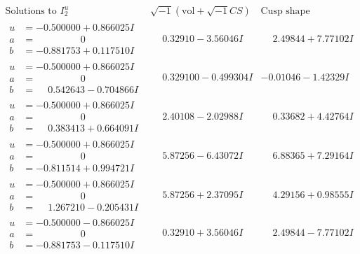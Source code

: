 \documentclass[1p]{elsarticle_modified}
\theoremstyle{definition}
\newcommand{\I}{\sqrt{-1}}
\begin{document}
$$\begin{array}{c|c|c}  
\text{Solutions to }I^u_{2}& \I (\text{vol} + \sqrt{-1}CS) & \text{Cusp shape}\\
 \hline 
\begin{aligned}
u &= -0.500000 + 0.866025 I \\
a &= \phantom{-0.000000 } 0 \\
b &= -0.881753 + 0.117510 I\end{aligned}
 & \phantom{-}0.32910 - 3.56046 I & \phantom{-}2.49844 + 7.77102 I \\ \hline\begin{aligned}
u &= -0.500000 + 0.866025 I \\
a &= \phantom{-0.000000 } 0 \\
b &= \phantom{-}0.542643 - 0.704866 I\end{aligned}
 & \phantom{-}0.329100 - 0.499304 I & -0.01046 - 1.42329 I \\ \hline\begin{aligned}
u &= -0.500000 + 0.866025 I \\
a &= \phantom{-0.000000 } 0 \\
b &= \phantom{-}0.383413 + 0.664091 I\end{aligned}
 & \phantom{-}2.40108 - 2.02988 I & \phantom{-}0.33682 + 4.42764 I \\ \hline\begin{aligned}
u &= -0.500000 + 0.866025 I \\
a &= \phantom{-0.000000 } 0 \\
b &= -0.811514 + 0.994721 I\end{aligned}
 & \phantom{-}5.87256 - 6.43072 I & \phantom{-}6.88365 + 7.29164 I \\ \hline\begin{aligned}
u &= -0.500000 + 0.866025 I \\
a &= \phantom{-0.000000 } 0 \\
b &= \phantom{-}1.267210 - 0.205431 I\end{aligned}
 & \phantom{-}5.87256 + 2.37095 I & \phantom{-}4.29156 + 0.98555 I \\ \hline\begin{aligned}
u &= -0.500000 - 0.866025 I \\
a &= \phantom{-0.000000 } 0 \\
b &= -0.881753 - 0.117510 I\end{aligned}
 & \phantom{-}0.32910 + 3.56046 I & \phantom{-}2.49844 - 7.77102 I \\ \hline\begin{aligned}

\end{aligned}
\end{array}$$
\end{document}
